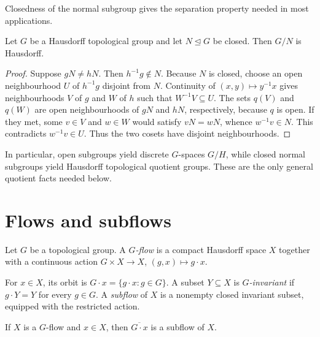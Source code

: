 Closedness of the normal subgroup gives the separation property needed in most
applications.

\begin{proposition}
    \label{prop:closed-normal-hausdorff-quotient}
    Let \(G\) be a Hausdorff topological group and let
    \(N\trianglelefteq G\) be closed.  Then \(G/N\) is Hausdorff.
\end{proposition}

\begin{proof}
    Suppose \(gN\neq hN\).  Then \(h^{-1}g\notin N\).  Because \(N\) is closed,
    choose an open neighbourhood \(U\) of \(h^{-1}g\) disjoint from \(N\).
    Continuity of \((x,y)\mapsto y^{-1}x\) gives neighbourhoods \(V\) of \(g\)
    and \(W\) of \(h\) such that \(W^{-1}V\subseteq U\).  The sets \(q(V)\)
    and \(q(W)\) are open neighbourhoods of \(gN\) and \(hN\), respectively,
    because \(q\) is open.  If they met, some \(v\in V\) and \(w\in W\) would
    satisfy \(vN=wN\), whence \(w^{-1}v\in N\).  This contradicts
    \(w^{-1}v\in U\).  Thus the two cosets have disjoint neighbourhoods.
\end{proof}

In particular, open subgroups yield discrete \(G\)-spaces \(G/H\), while closed
normal subgroups yield Hausdorff topological quotient groups.  These are the
only general quotient facts needed below.

\section{Flows and subflows}

\begin{definition}
    Let \(G\) be a topological group.  A \emph{\(G\)-flow} is a compact
    Hausdorff space \(X\) together with a continuous action
    \(G\times X\to X\), \((g,x)\mapsto g\cdot x\).
\end{definition}

For \(x\in X\), its orbit is \(G\cdot x=\{g\cdot x:g\in G\}\).  A subset
\(Y\subseteq X\) is \emph{\(G\)-invariant} if \(g\cdot Y=Y\) for every
\(g\in G\).  A \emph{subflow} of \(X\) is a nonempty closed invariant subset,
equipped with the restricted action.

\begin{proposition}
    \label{prop:orbit-closure-subflow}
    If \(X\) is a \(G\)-flow and \(x\in X\), then
    \(\overline{G\cdot x}\) is a subflow of \(X\).
\end{proposition}

